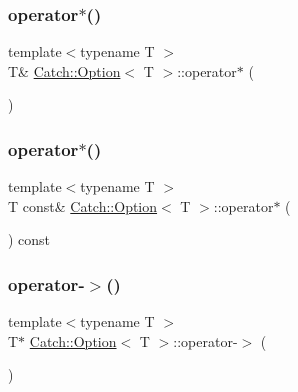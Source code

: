 \subsubsection{\texorpdfstring{operator$\ast$()}{operator*()}\hspace{0.1cm}{\footnotesize\ttfamily [1/2]}}
{\footnotesize\ttfamily template$<$typename T $>$ \\
T\& \mbox{\hyperlink{class_catch_1_1_option}{Catch\+::\+Option}}$<$ T $>$\+::operator$\ast$ (\begin{DoxyParamCaption}{ }\end{DoxyParamCaption})\hspace{0.3cm}{\ttfamily [inline]}}

\mbox{\label{class_catch_1_1_option_a734fc9c2eb1a1f7f8e8f6a4eb12160f0}} 
\subsubsection{\texorpdfstring{operator$\ast$()}{operator*()}\hspace{0.1cm}{\footnotesize\ttfamily [2/2]}}
{\footnotesize\ttfamily template$<$typename T $>$ \\
T const\& \mbox{\hyperlink{class_catch_1_1_option}{Catch\+::\+Option}}$<$ T $>$\+::operator$\ast$ (\begin{DoxyParamCaption}{ }\end{DoxyParamCaption}) const\hspace{0.3cm}{\ttfamily [inline]}}

\mbox{\label{class_catch_1_1_option_acad340798a16c8f700f8763119e90f31}} 
\subsubsection{\texorpdfstring{operator-\/$>$()}{operator->()}\hspace{0.1cm}{\footnotesize\ttfamily [1/2]}}
{\footnotesize\ttfamily template$<$typename T $>$ \\
T$\ast$ \mbox{\hyperlink{class_catch_1_1_option}{Catch\+::\+Option}}$<$ T $>$\+::operator-\/$>$ (\begin{DoxyParamCaption}{ }\end{DoxyParamCaption})\hspace{0.3cm}{\ttfamily [inline]}}

